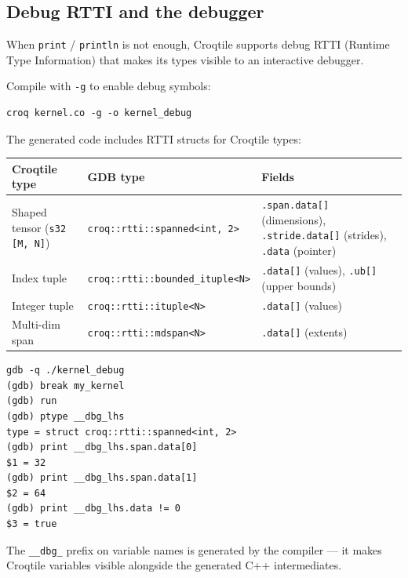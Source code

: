 \subsection*{Debug RTTI and the debugger}

When \texttt{print} / \texttt{println} is not enough, Croqtile supports debug RTTI (Runtime Type Information) that makes its types visible to an interactive debugger.

Compile with \texttt{-g} to enable debug symbols:

\begin{lstlisting}[language={},caption={Debug RTTI and the debugger}]
croq kernel.co -g -o kernel_debug
\end{lstlisting}

The generated code includes RTTI structs for Croqtile types:

\begin{table}[htbp]
\centering\small
\begin{tabularx}{\linewidth}{@{}lXX@{}}
\toprule
\textbf{Croqtile type} & \textbf{GDB type} & \textbf{Fields} \\
\midrule
Shaped tensor   (\texttt{s32 [M, N]}) & \texttt{croq:\allowbreak{}:\allowbreak{}rtti:\allowbreak{}:\allowbreak{}spanned\textless{}int, 2\textgreater{}} & \texttt{.span.data[]} (dimensions),  \texttt{.stride.data[]} (strides),  \texttt{.data} (pointer) \\
Index tuple & \texttt{croq:\allowbreak{}:\allowbreak{}rtti:\allowbreak{}:\allowbreak{}bounded\_\allowbreak{}ituple\textless{}N\textgreater{}} & \texttt{.data[]} (values),  \texttt{.ub[]} (upper bounds) \\
Integer tuple & \texttt{croq:\allowbreak{}:\allowbreak{}rtti:\allowbreak{}:\allowbreak{}ituple\textless{}N\textgreater{}} & \texttt{.data[]} (values) \\
Multi-dim span & \texttt{croq:\allowbreak{}:\allowbreak{}rtti:\allowbreak{}:\allowbreak{}mdspan\textless{}N\textgreater{}} & \texttt{.data[]} (extents) \\
\bottomrule
\end{tabularx}
\end{table}

\begin{lstlisting}[language={},caption={Debug RTTI and the debugger}]
gdb -q ./kernel_debug
(gdb) break my_kernel
(gdb) run
(gdb) ptype __dbg_lhs
type = struct croq::rtti::spanned<int, 2>
(gdb) print __dbg_lhs.span.data[0]
$1 = 32
(gdb) print __dbg_lhs.span.data[1]
$2 = 64
(gdb) print __dbg_lhs.data != 0
$3 = true
\end{lstlisting}

The \texttt{\_\_dbg\_} prefix on variable names is generated by the compiler --- it makes Croqtile variables visible alongside the generated C++ intermediates.
